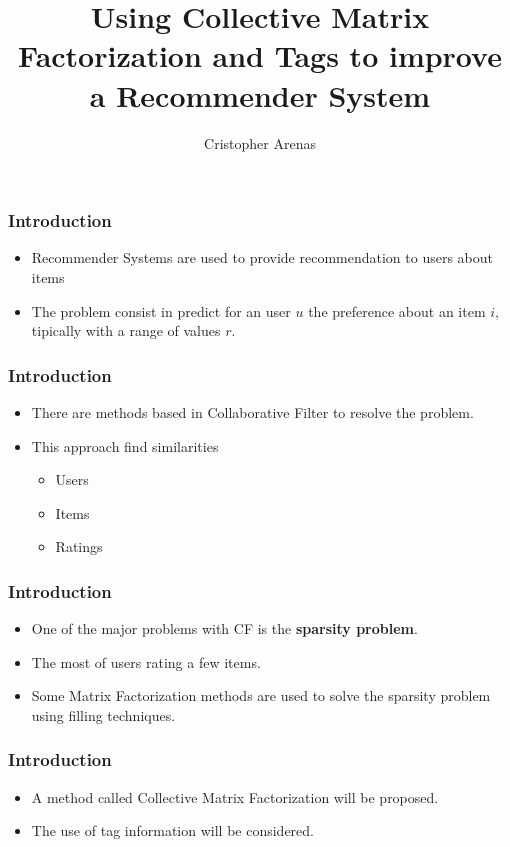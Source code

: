 \documentclass[aspectratio=169,handout]{beamer}
\title[IIC3633]{Using Collective Matrix Factorization and Tags to improve a Recommender System}
\author{Cristopher Arenas}
\institute{PUC, Campus San Joaquín}
\begin{document}
\begin{frame}
\maketitle
\end{frame}

\begin{frame}
\frametitle{Introduction}
\begin{itemize}
\item Recommender Systems are used to provide recommendation to users about items
\item The problem consist in predict for an user $u$ the preference about an item $i$, tipically with a range of values $r$.
\end{itemize}
\end{frame}

\begin{frame}
\frametitle{Introduction}
\begin{itemize}
\item There are methods based in Collaborative Filter to resolve the problem.
\item This approach find similarities
\begin{itemize}
\item Users
\item Items
\item Ratings
\end{itemize}
\end{itemize}
\end{frame}

\begin{frame}
\frametitle{Introduction}
\begin{itemize}
\item One of the major problems with CF is the \textbf{sparsity problem}.
\item The most of users rating a few items.
\pause
\item Some Matrix Factorization methods are used to solve the sparsity problem using filling techniques.
\end{itemize}
\end{frame}

\begin{frame}
\frametitle{Introduction}
\begin{itemize}
\item A method called Collective Matrix Factorization will be proposed.
\pause
\item The use of tag information will be considered.
\end{itemize}
\end{frame}
\end{document}
